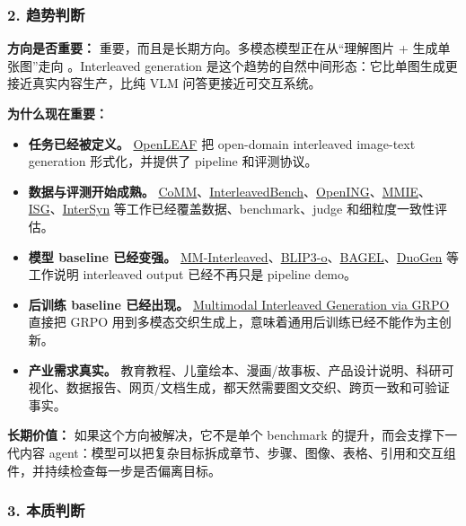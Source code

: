 \subsubsection*{2. 趋势判断}

\textbf{方向是否重要：} 重要，而且是长期方向。多模态模型正在从“理解图片 + 生成单张图”走向 。Interleaved generation 是这个趋势的自然中间形态：它比单图生成更接近真实内容生产，比纯 VLM 问答更接近可交互系统。

\textbf{为什么现在重要：}

\begin{itemize}[leftmargin=1.5em]
  \item \textbf{任务已经被定义。} \href{https://arxiv.org/abs/2310.07749}{OpenLEAF} 把 open-domain interleaved image-text generation 形式化，并提供了 pipeline 和评测协议。
  \item \textbf{数据与评测开始成熟。} \href{https://arxiv.org/abs/2406.10462}{CoMM}、\href{https://arxiv.org/abs/2406.14643}{InterleavedBench}、\href{https://arxiv.org/abs/2411.18499}{OpenING}、\href{https://arxiv.org/abs/2410.10139}{MMIE}、\href{https://arxiv.org/abs/2411.17188}{ISG}、\href{https://arxiv.org/abs/2506.09427}{InterSyn} 等工作已经覆盖数据、benchmark、judge 和细粒度一致性评估。
  \item \textbf{模型 baseline 已经变强。} \href{https://arxiv.org/abs/2401.10208}{MM-Interleaved}、\href{https://arxiv.org/abs/2505.09568}{BLIP3-o}、\href{https://arxiv.org/abs/2505.14683}{BAGEL}、\href{https://arxiv.org/abs/2602.00508}{DuoGen} 等工作说明 interleaved output 已经不再只是 pipeline demo。
  \item \textbf{后训练 baseline 已经出现。} \href{https://arxiv.org/abs/2603.09538}{Multimodal Interleaved Generation via GRPO} 直接把 GRPO 用到多模态交织生成上，意味着通用后训练已经不能作为主创新。
  \item \textbf{产业需求真实。} 教育教程、儿童绘本、漫画/故事板、产品设计说明、科研可视化、数据报告、网页/文档生成，都天然需要图文交织、跨页一致和可验证事实。
\end{itemize}

\textbf{长期价值：} 如果这个方向被解决，它不是单个 benchmark 的提升，而会支撑下一代内容 agent：模型可以把复杂目标拆成章节、步骤、图像、表格、引用和交互组件，并持续检查每一步是否偏离目标。

\subsubsection*{3. 本质判断}

